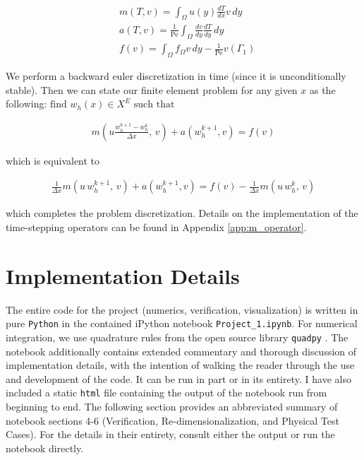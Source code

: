 \documentclass[10pt]{article}
\newcommand{\Pe}{\text{Pe}}
\begin{document}
    \begin{align}
      &m(T,v)  = \int_\Omega u(y) \frac{dT}{dx} v\, dy \\
      &a(T, v) =\frac{1}{\Pe} \int_{\Omega}^{} \frac{dv}{dy} \frac{dT}{dy} \, dy \\
      &f(v)    = \int_{\Omega}^{} f_\Omega v\,dy -\frac{1}{\Pe} v(\Gamma_1)
    \end{align}

    We perform a backward euler discretization in time (since it is unconditionally stable). Then we
    can state our finite element problem for any given $x$ as the following: $\text{find } w_h(x)\in
    X^E \text{ such that }$

    \begin{align}
      m\left(u \frac{w_h^{k+1} - w_h^{k}}{\Delta x},\, v  \right) 
      + a\left(w_h^{k+1},v\right) = f(v)
    \end{align}

    which is equivalent to 

    \begin{align}
      \frac{1}{\Delta x} m\left(u \, w_h^{k+1},\, v  \right) 
      + a\left(w_h^{k+1},v\right) = f(v) - \frac{1}{\Delta x} m(u\, w_h^k,\, v)
    \end{align}

    which completes the problem discretization.  Details on the implementation of the time-stepping
    operators can be found in Appendix \ref{app:m_operator}.

\section{Implementation Details}

  The entire code for the project (numerics, verification, visualization) is written in pure
  \texttt{Python} in the contained iPython notebook \texttt{Project\_1.ipynb}.  For numerical
  integration, we use quadrature rules from the open source library \texttt{quadpy} \cite{quadpy}.
  The notebook additionally contains extended commentary and thorough discussion of implementation
  details, with the intention of walking the reader through the use and development of the code. It
  can be run in part or in its entirety. I have also included a static \texttt{html} file containing
  the output of the notebook run from beginning to end. The following section provides an
  abbreviated summary of notebook sections 4-6 (Verification, Re-dimensionalization, and Physical
  Test Cases). For the details in their entirety, consult either the output or run the notebook
  directly. 
\end{document}
